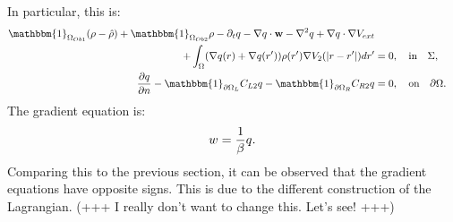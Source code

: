 In particular, this is:
\begin{align*}
\mathbbm{1}_{\Omega_{Ob1}}(\rho- \hat{\rho}) +\mathbbm{1}_{\Omega_{Ob2}}\rho  - \partial_t  \Adjb  - \nabla \Adjb \cdot \mathbf{w}  - \nabla^2 \Adjb \notag 
+  \nabla \Adjb \cdot \nabla V_{ext}  \notag \\
+ \int_\Omega (\nabla  \Adjb(r)+\nabla  \Adjb(r')) \rho(r') \nabla V_2(|r-r'|) dr' &=0, \quad \text{in} \quad \Sigma, \\
\frac{\partial \Adjb }{\partial n}  -\mathbbm{1}_{\partial \Omega_L} C_{L2} \Adjb   -\mathbbm{1}_{\partial \Omega_R} C_{R2} \Adjb&=0, \quad \text{on} \quad \partial \Omega.
\end{align*}
The gradient equation is:
\begin{align*}
w = \frac{1}{\beta}q.
\end{align*}
Comparing this to the previous section, it can be observed that the gradient equations have opposite signs. This is due to the different construction of the Lagrangian. (+++ I really don't want to change this. Let's see! +++)


